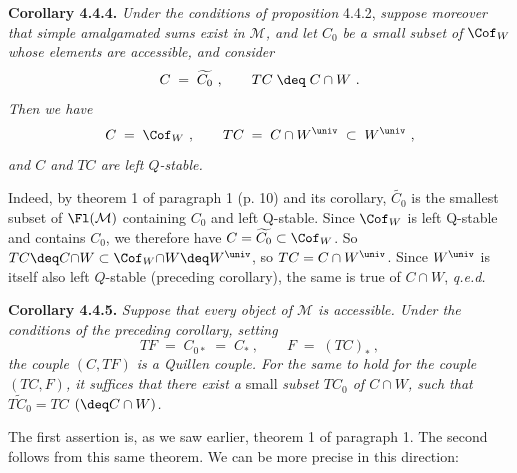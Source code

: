 \textbf{Corollary 4.4.4.} \textit{Under the conditions of proposition} 4.4.2, \textit{suppose moreover that simple amalgamated sums exist in $\mathcal{M}$, and let $C_0$ be a small subset of} $\Cof_W$ \textit{whose elements are accessible, and consider}
\[
C\;=\;\widetilde{C_0}\ ,\qquad TC\;\deq\;C\cap W\ .
\]
\textit{Then we have}
\[
C\;=\;\Cof_W\ ,\qquad TC\;=\;C\cap W^{\univ}\;\subset\;W^{\univ}\ ,
\]
\textit{and $C$ and $TC$ are left $Q$-stable.}

Indeed, by theorem 1 of paragraph 1 (p. 10) and its corollary, $\widetilde{C_0}$ is the smallest subset of $\Fl(\mathcal{M})$ containing $C_0$ and left Q-stable. Since $\Cof_W$ is left Q-stable and contains $C_0$, we therefore have $C=\widetilde{C_0}\subset\Cof_W$. So $TC\deq C{\cap}W\subset\Cof_W{\cap}W\deq W^{\univ}$, so $TC=C\cap W^{\univ}$. Since $W^{\univ}$ is itself also left $Q$-stable (preceding corollary), the same is true of $C\cap W$, \quad \textit{q.e.d.}

\textbf{Corollary 4.4.5.} \textit{Suppose that every object of $\mathcal{M}$ is accessible. Under the conditions of the preceding corollary, setting}
\[
TF\;=\;C_{0*}\;=\;C_*\ ,\qquad F\;=\;(TC)_*\ ,
\]
\textit{the couple $(C,TF)$ is a Quillen couple. For the same to hold for the couple $(TC,F)$, it suffices that there exist a} small \textit{subset $TC_0$ of $C\cap W$, such that $\widetilde{TC_0}=TC$ $(\deq C\cap W)$.}

The first assertion is, as we saw earlier, theorem 1 of paragraph 1. The second follows from this same theorem. We can be more precise in this direction:

